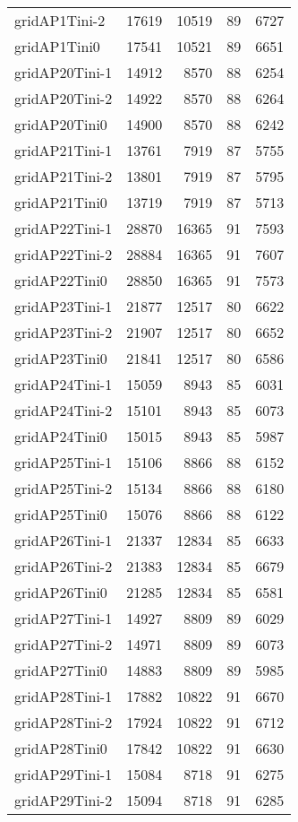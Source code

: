 \begin{longtable}{lrrrr}
gridAP1Tini-2 & 17619 & 10519 & 89 & 6727 \\
gridAP1Tini0 & 17541 & 10521 & 89 & 6651 \\
gridAP20Tini-1 & 14912 & 8570 & 88 & 6254 \\
gridAP20Tini-2 & 14922 & 8570 & 88 & 6264 \\
gridAP20Tini0 & 14900 & 8570 & 88 & 6242 \\
gridAP21Tini-1 & 13761 & 7919 & 87 & 5755 \\
gridAP21Tini-2 & 13801 & 7919 & 87 & 5795 \\
gridAP21Tini0 & 13719 & 7919 & 87 & 5713 \\
gridAP22Tini-1 & 28870 & 16365 & 91 & 7593 \\
gridAP22Tini-2 & 28884 & 16365 & 91 & 7607 \\
gridAP22Tini0 & 28850 & 16365 & 91 & 7573 \\
gridAP23Tini-1 & 21877 & 12517 & 80 & 6622 \\
gridAP23Tini-2 & 21907 & 12517 & 80 & 6652 \\
gridAP23Tini0 & 21841 & 12517 & 80 & 6586 \\
gridAP24Tini-1 & 15059 & 8943 & 85 & 6031 \\
gridAP24Tini-2 & 15101 & 8943 & 85 & 6073 \\
gridAP24Tini0 & 15015 & 8943 & 85 & 5987 \\
gridAP25Tini-1 & 15106 & 8866 & 88 & 6152 \\
gridAP25Tini-2 & 15134 & 8866 & 88 & 6180 \\
gridAP25Tini0 & 15076 & 8866 & 88 & 6122 \\
gridAP26Tini-1 & 21337 & 12834 & 85 & 6633 \\
gridAP26Tini-2 & 21383 & 12834 & 85 & 6679 \\
gridAP26Tini0 & 21285 & 12834 & 85 & 6581 \\
gridAP27Tini-1 & 14927 & 8809 & 89 & 6029 \\
gridAP27Tini-2 & 14971 & 8809 & 89 & 6073 \\
gridAP27Tini0 & 14883 & 8809 & 89 & 5985 \\
gridAP28Tini-1 & 17882 & 10822 & 91 & 6670 \\
gridAP28Tini-2 & 17924 & 10822 & 91 & 6712 \\
gridAP28Tini0 & 17842 & 10822 & 91 & 6630 \\
gridAP29Tini-1 & 15084 & 8718 & 91 & 6275 \\
gridAP29Tini-2 & 15094 & 8718 & 91 & 6285 \\

\end{longtable}
